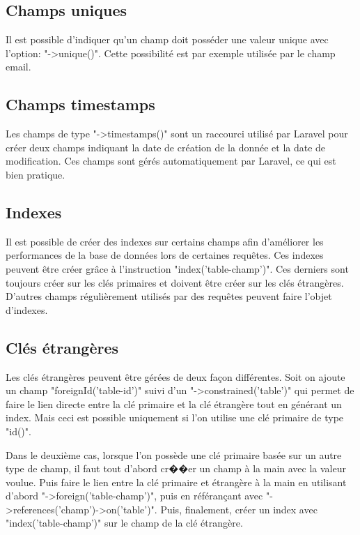 \documentclass[
    iai, %
    il, %
]{heig-tb}
\begin{document}
\subsection{Champs uniques}
Il est possible d'indiquer qu'un champ doit posséder une valeur unique avec l'option: "->unique()".\newline
Cette possibilité est par exemple utilisée par le champ email.

\subsection{Champs timestamps}
Les champs de type "->timestamps()" sont un raccourci utilisé par Laravel pour créer deux champs indiquant la date de création de la donnée et la date de modification. Ces champs sont gérés automatiquement par Laravel, ce qui est bien pratique.

\subsection{Indexes}
Il est possible de créer des indexes sur certains champs afin d'améliorer les performances de la base de données lors de certaines requêtes. Ces indexes peuvent être créer grâce à l'instruction "index('table-champ')".\newline
Ces derniers sont toujours créer sur les clés primaires et doivent être créer sur les clés étrangères. D'autres champs régulièrement utilisés par des requêtes peuvent faire l'objet d'indexes.

\subsection{Clés étrangères}
Les clés étrangères peuvent être gérées de deux façon différentes.\newline
Soit on ajoute un champ "foreignId('table-id')" suivi d'un "->constrained('table')" qui permet de faire le lien directe entre la clé primaire et la clé étrangère tout en générant un index. Mais ceci est possible uniquement si l'on utilise une clé primaire de type "id()".

Dans le deuxième cas, lorsque l'on possède une clé primaire basée sur un autre type de champ, il faut tout d'abord cr��er un champ à la main avec la valeur voulue.\newline
Puis faire le lien entre la clé primaire et étrangère à la main en utilisant d'abord "->foreign('table-champ')", puis en référançant avec "->references('champ')->on('table')".\newline
Puis, finalement, créer un index avec "index('table-champ')" sur le champ de la clé étrangère.
\end{document}
